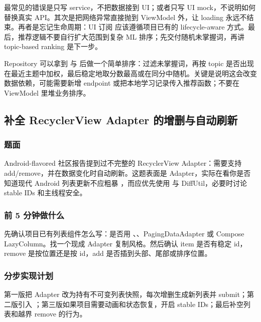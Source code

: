 最常见的错误是只写 service，不把数据接到 UI；或者只写 UI mock，不说明如何替换真实 API。其次是把网络异常直接抛到 ViewModel 外，让 loading 永远不结束。再者是忘记生命周期：UI 订阅  应该遵循项目已有的 lifecycle-aware 方式。最后，推荐逻辑不要自行扩大范围到复杂 ML 排序；先交付随机未掌握词，再讲 topic-based ranking 是下一步。

\begin{followup}[“如果要按最近学习主题推荐呢？”]
Repository 可以拿到  与  后做一个简单排序：过滤未掌握词，再按 topic 是否出现在最近主题中加权，最后稳定地取分数最高或在同分中随机。关键是说明这会改变数据依赖，可能需要新增 endpoint 或把本地学习记录传入推荐函数；不要在 ViewModel 里堆业务排序。
\end{followup}

\subsection{补全 RecyclerView Adapter 的增删与自动刷新}

\subsubsection*{题面}

Android-flavored 社区报告提到过不完整的 RecyclerView Adapter：需要支持 add/remove，并在数据变化时自动刷新。\srccommunity 这题表面是 Adapter，实际在看你是否知道现代 Android 列表更新不应粗暴 ，而应优先使用  与 DiffUtil，必要时讨论 stable IDs 和主线程安全。

\subsubsection*{前 5 分钟做什么}

先确认项目已有列表组件怎么写：是否用 、、PagingDataAdapter 或 Compose LazyColumn。找一个现成 Adapter 复制风格。然后确认 item 是否有稳定 id，remove 是按位置还是按 id，add 是否插到头部、尾部或排序位置。

\subsubsection*{分步实现计划}

第一版把 Adapter 改为持有不可变列表快照，每次增删生成新列表并 submit；第二版引入 ；第三版如果项目需要动画和状态恢复，开启 stable IDs；最后补空列表和越界 remove 的行为。


